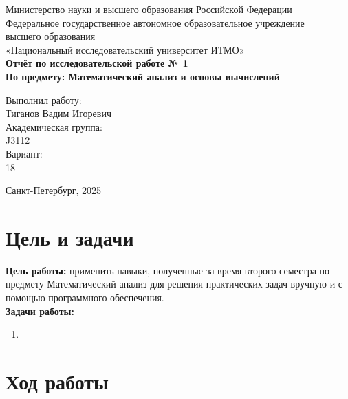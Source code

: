 \documentclass[a4paper,12pt]{article}
\begin{document}
\thispagestyle{empty}
\begin{center}
    \large
    Министерство науки и высшего образования Российской Федерации\\
    Федеральное государственное автономное образовательное учреждение\\
    высшего образования\\
    «Национальный исследовательский университет ИТМО»\\
    \vspace{5cm}
    \textbf{Отчёт по исследовательской работе № 1}\\
    \textbf{По предмету: Математический анализ и основы вычислений}\\
    \vspace{6cm}
    \begin{flushright}
        Выполнил работу:\\ Тиганов Вадим Игоревич\\
        \vspace{1cm}
        Академическая группа: \\ J3112\\
        \vspace{1cm}
        Вариант: \\18
    \end{flushright}
    \vspace{1cm}
    \vspace{3cm}
    \begin{center}
        Санкт-Петербург, 2025\\
    \end{center}
\end{center}

\newpage

\tableofcontents

\newpage

\section{Цель и задачи}
\textbf{Цель работы:} применить навыки, полученные за время второго семестра по предмету Математический анализ для решения практических задач вручную и с помощью программного обеспечения.\\
\textbf{Задачи работы:}
\begin{enumerate}
    \item 
\end{enumerate}

\section{Ход работы}
\end{document}

